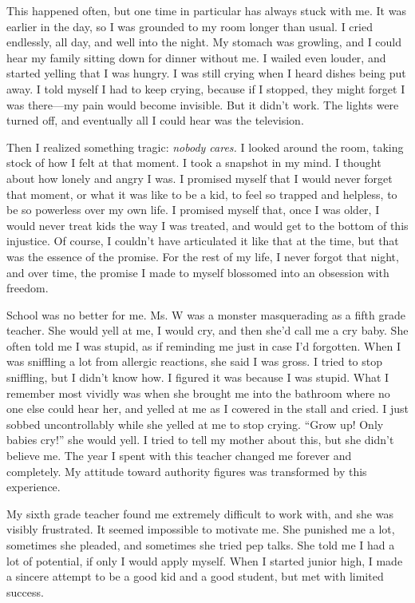 This happened often, but one time in particular has always stuck with me. It was earlier in the day, so I was grounded to my room longer than usual. I cried endlessly, all day, and well into the night. My stomach was growling, and I could hear my family sitting down for dinner without me. I wailed even louder, and started yelling that I was hungry. I was still crying when I heard dishes being put away. I told myself I had to keep crying, because if I stopped, they might forget I was there---my pain would become invisible. But it didn't work. The lights were turned off, and eventually all I could hear was the television.

Then I realized something tragic: \emph{nobody cares.} I looked around the room, taking stock of how I felt at that moment. I took a snapshot in my mind. I thought about how lonely and angry I was. I promised myself that I would never forget that moment, or what it was like to be a kid, to feel so trapped and helpless, to be so powerless over my own life. I promised myself that, once I was older, I would never treat kids the way I was treated, and would get to the bottom of this injustice. Of course, I couldn't have articulated it like that at the time, but that was the essence of the promise. For the rest of my life, I never forgot that night, and over time, the promise I made to myself blossomed into an obsession with freedom.

School was no better for me. Ms. W was a monster masquerading as a fifth grade teacher. She would yell at me, I would cry, and then she'd call me a cry baby. She often told me I was stupid, as if reminding me just in case I'd forgotten. When I was sniffling a lot from allergic reactions, she said I was gross. I tried to stop sniffling, but I didn't know how. I figured it was because I was stupid. What I remember most vividly was when she brought me into the bathroom where no one else could hear her, and yelled at me as I cowered in the stall and cried. I just sobbed uncontrollably while she yelled at me to stop crying. ``Grow up! Only babies cry!'' she would yell. I tried to tell my mother about this, but she didn't believe me. The year I spent with this teacher changed me forever and completely. My attitude toward authority figures was transformed by this experience.

My sixth grade teacher found me extremely difficult to work with, and she was visibly frustrated. It seemed impossible to motivate me. She punished me a lot, sometimes she pleaded, and sometimes she tried pep talks. She told me I had a lot of potential, if only I would apply myself. When I started junior high, I made a sincere attempt to be a good kid and a good student, but met with limited success.

